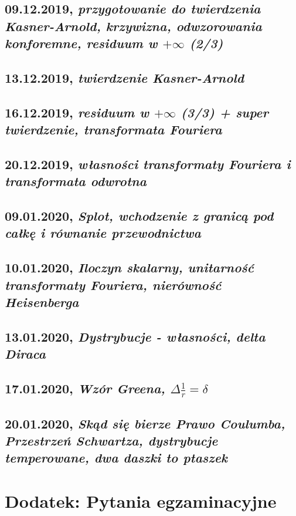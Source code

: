 \documentclass[a5paper, oneside]{memoir}
\begin{document}
\chapter{09.12.2019, \textit{przygotowanie do twierdzenia Kasner-Arnold, krzywizna, odwzorowania konforemne, residuum w $+\infty$ (2/3)}}

\chapter{13.12.2019, \textit{twierdzenie Kasner-Arnold}}

\chapter{16.12.2019, \textit{residuum w $+\infty$ (3/3) + super twierdzenie, transformata Fouriera}}

\chapter{20.12.2019, \textit{własności transformaty Fouriera i transformata odwrotna}}

\chapter{09.01.2020, \textit{Splot, wchodzenie z granicą pod całkę i równanie przewodnictwa}}

\chapter{10.01.2020, \textit{Iloczyn skalarny, unitarność transformaty Fouriera, nierówność Heisenberga}}

\chapter{13.01.2020, \textit{Dystrybucje - własności, delta Diraca}}

\chapter{17.01.2020, \textit{Wzór Greena, $\Delta \frac{1}{r} = \delta$ }}

\chapter{20.01.2020, \textit{Skąd się bierze Prawo Coulumba, Przestrzeń Schwartza, dystrybucje temperowane, dwa daszki to ptaszek}}


\part{\textbf{Dodatek:} Pytania egzaminacyjne}

\end{document}
